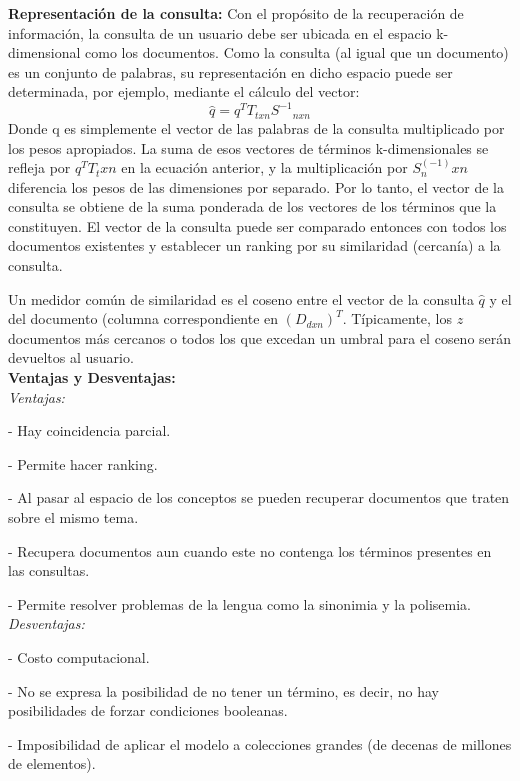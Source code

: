 \documentclass[runningheads]{llncs}
\begin{document}
\textbf{Representación de la consulta:}
Con el propósito de la recuperación de información, la consulta de un usuario debe ser ubicada en el espacio k-dimensional como los documentos. Como la consulta (al igual que un documento) es un conjunto de palabras, su representación en dicho espacio puede ser determinada, por ejemplo, mediante el cálculo del vector:\\
\begin{equation}
\widehat{q} = q^T T_{txn} {S^{-1}}_{nxn}
\end{equation}
Donde q es simplemente el vector de las palabras de la consulta multiplicado por los pesos apropiados. La suma de esos vectores de términos k-dimensionales se refleja por $q^T T_txn$ en la ecuación anterior, y la multiplicación por $S^{(-1)}_nxn$ diferencia los pesos de las dimensiones por separado. Por lo tanto, el vector de la consulta se obtiene de la suma ponderada de los vectores de los términos que la constituyen. El vector de la consulta puede ser comparado entonces con todos los documentos existentes y establecer un ranking por su similaridad (cercanía) a la consulta.

Un medidor común de similaridad es el coseno entre el vector de la consulta $\widehat{q}$ y el del documento (columna correspondiente en ${(D_{dxn})}^T$. Típicamente, los $z$ documentos más cercanos o todos los que excedan un umbral para el coseno serán devueltos al usuario.\\

\textbf{Ventajas y Desventajas:}\\
\textit{Ventajas:}

-	Hay coincidencia parcial. 

-	Permite hacer ranking. 

-	Al pasar al espacio de los conceptos se pueden recuperar documentos que traten sobre el mismo tema. 

-	Recupera documentos aun cuando este no contenga los términos presentes en las consultas. 

-	Permite resolver problemas de la lengua como la sinonimia y la polisemia.\\
\textit{Desventajas:}

-	Costo computacional. 

-	No se expresa la posibilidad de no tener un término, es decir, no hay posibilidades de forzar condiciones booleanas. 

-	Imposibilidad de aplicar el modelo a colecciones grandes (de decenas de millones de elementos).\\
\end{document}
